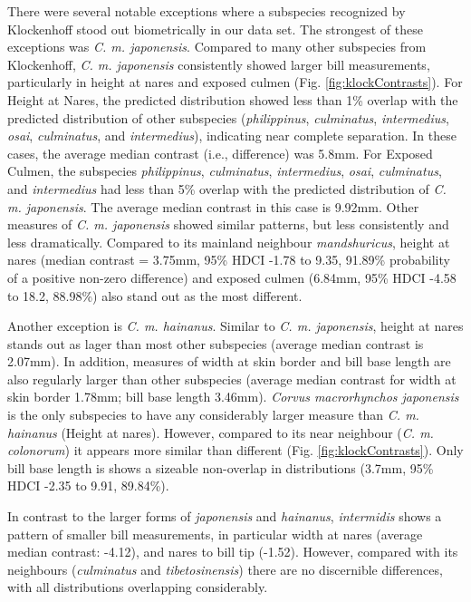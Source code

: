 \documentclass[10pt,a4paper]{article}
\begin{document}
There were several notable exceptions where a subspecies recognized by Klockenhoff stood out biometrically in our data set.
The strongest of these exceptions was \emph{C. m. japonensis}.
Compared to many other subspecies from Klockenhoff, \emph{C. m. japonensis} consistently showed larger bill measurements, particularly in height at nares and exposed culmen (Fig. \ref{fig:klockContrasts}).
For Height at Nares, the predicted distribution showed less than 1\% overlap with the predicted distribution of other subspecies (\emph{philippinus}, \emph{culminatus}, \emph{intermedius}, \emph{osai}, \emph{culminatus}, and \emph{intermedius}), indicating near complete separation.
In these cases, the average median contrast (i.e., difference) was 5.8mm.
For Exposed Culmen, the subspecies \emph{philippinus}, \emph{culminatus}, \emph{intermedius}, \emph{osai}, \emph{culminatus}, and \emph{intermedius} had less than 5\% overlap with the predicted distribution of \emph{C. m. japonensis}.
The average median contrast in this case is 9.92mm.
Other measures of \emph{C. m. japonensis} showed similar patterns, but less consistently and less dramatically.
Compared to its mainland neighbour \emph{mandshuricus}, height at nares (median contrast = 3.75mm, 95\% HDCI -1.78 to 9.35, 91.89\% probability of a positive non-zero difference) and exposed culmen (6.84mm, 95\% HDCI -4.58 to 18.2, 88.98\%) also stand out as the most different.

Another exception is \emph{C. m. hainanus}.
Similar to \emph{C. m. japonensis}, height at nares stands out as lager than most other subspecies (average median contrast is 2.07mm).
In addition, measures of width at skin border and bill base length are also regularly larger than other subspecies (average median contrast for width at skin border 1.78mm; bill base length 3.46mm).
\emph{Corvus macrorhynchos japonensis} is the only subspecies to have any considerably larger measure than \emph{C. m. hainanus} (Height at nares).
However, compared to its near neighbour (\emph{C. m. colonorum}) it appears more similar than different (Fig. \ref{fig:klockContrasts}).
Only bill base length is shows a sizeable non-overlap in distributions (3.7mm, 95\% HDCI -2.35 to 9.91, 89.84\%).

In contrast to the larger forms of \emph{japonensis} and \emph{hainanus}, \emph{intermidis} shows a pattern of smaller bill measurements, in particular width at nares (average median contrast: -4.12), and nares to bill tip (-1.52).
However, compared with its neighbours (\emph{culminatus} and \emph{tibetosinensis}) there are no discernible differences, with all distributions overlapping considerably.
\end{document}

